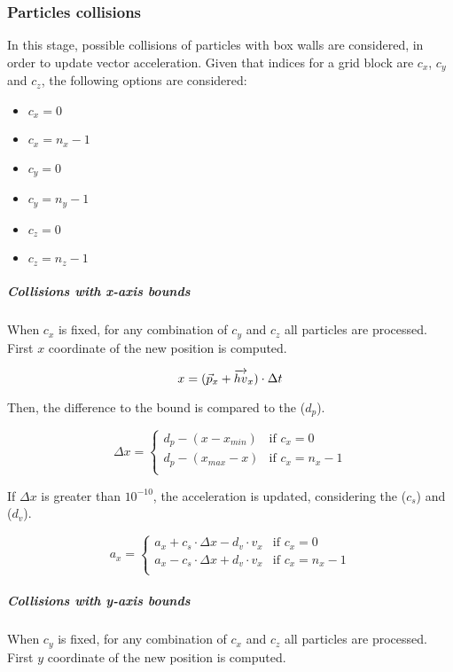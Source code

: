 \subsubsection{Particles collisions}

In this stage, possible collisions of particles with box walls are considered,
in order to update vector acceleration. 
Given that indices for a grid block are $c_x$, $c_y$ and $c_z$, the following
options are considered:

\begin{itemize}
\item $c_x=0$
\item $c_x=n_x-1$
\item $c_y=0$
\item $c_y=n_y-1$
\item $c_z=0$
\item $c_z=n_z-1$
\end{itemize}

\subparagraph{Collisions with x-axis bounds}

When $c_x$ is fixed, for any combination of $c_y$ and $c_z$ all particles are
processed. First $x$ coordinate of the new position is computed.

\[
x = (\vec{p}_x + \overrightarrow{hv}_x) \cdot \Delta t \\
\]

Then, the difference to the bound is compared to the  ($d_p$).

\[
\Delta x = 
\begin{cases}
d_p - (x - x_{min}) & \text{if } c_x = 0\\
d_p - (x_{max} - x) & \text{if } c_x = n_x -1\\
\end{cases}
\]

If $\Delta x$ is greater than $10^{-10}$, the acceleration is updated,
considering the  ($c_s$) and 
($d_v$).

\[
a_x = 
\begin{cases}
  a_x + c_s \cdot \Delta x - d_v \cdot v_x & \text{if  } c_x = 0\\
  a_x - c_s \cdot \Delta x + d_v \cdot v_x & \text{if  } c_x = n_x-1\\
\end{cases}
\]

\subparagraph{Collisions with y-axis bounds}

When $c_y$ is fixed, for any combination of $c_x$ and $c_z$ all particles are
processed. First $y$ coordinate of the new position is computed.

